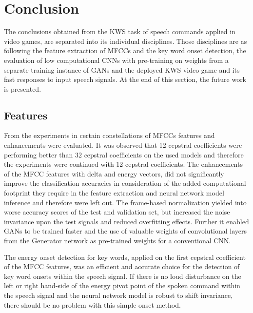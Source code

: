 
\chapter{Conclusion}\label{sec:conclusion}
The conclusions obtained from the KWS task of speech commands applied in video games, are separated into its individual disciplines.
Those disciplines are as following the feature extraction of MFCCs and the key word onset detection, the evaluation of low computational CNNs with pre-training on weights from a separate training instance of GANs and the deployed KWS video game and its fast responses to input speech signals.
At the end of this section, the future work is presented.



\section{Features}
\thesisStateReady
From the experiments in  certain constellations of MFCCs features and enhancements were evaluated.
It was observed that 12 cepstral coefficients were performing better than 32 cepstral coefficients on the used models and therefore the experiments were continued with 12 cepstral coefficients.
The enhancements of the MFCC features with delta and energy vectors, did not significantly improve the classification accuracies in consideration of the added computational footprint they require in the feature extraction and neural network model inference and therefore were left out.
The frame-based normalization yielded into worse accuracy scores of the test and validation set, but increased the noise invariance upon the test signals and reduced overfitting effects.
Further it enabled GANs to be trained faster and the use of valuable weights of convolutional layers from the Generator network as pre-trained weights for a conventional CNN.

The energy onset detection for key words, applied on the first cepstral coefficient of the MFCC features, was an efficient and accurate choice for the detection of key word onsets within the speech signal.
If there is no loud disturbance on the left or right hand-side of the energy pivot point of the spoken command within the speech signal and the neural network model is robust to shift invariance, there should be no problem with this simple onset method.



